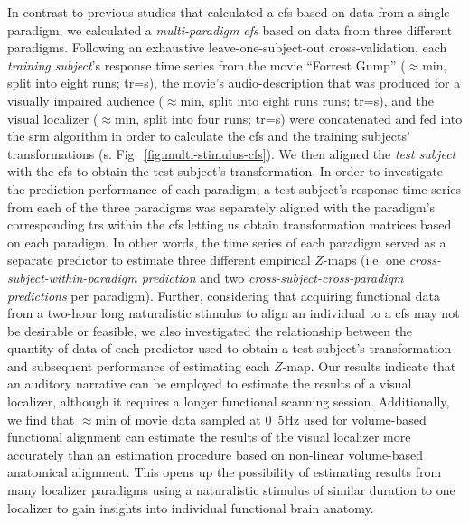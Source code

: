 In contrast to previous studies \citep{jiahui2020predicting,
guntupalli2016model, haxby2011common} that calculated a \ac{cfs} based on data
from a single paradigm, we calculated a \textit{multi-paradigm \ac{cfs}} based
on data from three different paradigms.
Following an exhaustive leave-one-subject-out cross-validation, each
\textit{training subject}'s response time series from
%
the movie ``Forrest Gump'' ($\approx$\unit[120]{min}, split into eight runs;
\ac{tr}=\unit[2]{s}),
%
the movie's audio-description that was produced for a visually impaired audience
($\approx$\unit[120]{min}, split into eight runs runs; \ac{tr}=\unit[2]{s}), and
%
the visual localizer ($\approx$\unit[20]{min}, split into four runs;
\ac{tr}=\unit[2]{s})
%
were concatenated and fed into the \ac{srm} algorithm in order to calculate the
\ac{cfs} and the training subjects' transformations (s.
Fig.~\ref{fig:multi-stimulus-cfs}).
We then aligned the \textit{test subject} with the \ac{cfs} to obtain the test
subject's transformation.
%
In order to investigate the prediction performance of each paradigm, a test
subject's response time series from each of the three paradigms was separately
aligned with the paradigm's corresponding \acp{tr} within the \ac{cfs} letting
us obtain transformation matrices based on each paradigm.
%
In other words, the time series of each paradigm served as a separate predictor
to estimate three different empirical $Z$-maps (i.e. one
\textit{cross-subject-within-paradigm prediction} and two
\textit{cross-subject-cross-paradigm predictions} per paradigm).
%
Further, considering that acquiring functional data from a two-hour long
naturalistic stimulus to align an individual to a \ac{cfs} may not be desirable
or feasible, we also investigated the relationship between the quantity of data
of each predictor used to obtain a test subject's transformation and subsequent
performance of estimating each $Z$-map.
%
Our results indicate that an auditory narrative can be employed to estimate the
results of a visual localizer, although it requires a longer functional scanning
session.
%
Additionally, we find that $\approx$\unit[15]{min} of movie data sampled at
\unit{0.5}{Hz} used for volume-based functional alignment can estimate the
results of the visual localizer more accurately than an estimation procedure
based on non-linear volume-based anatomical alignment.
%
This opens up the possibility of estimating results from many localizer
paradigms using a naturalistic stimulus of similar duration to one localizer to
gain insights into individual functional brain anatomy.




